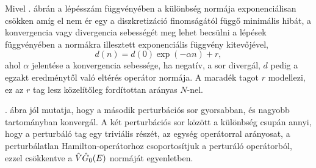 Mivel . ábrán a lépésszám függvényében a különbség normája exponenciálisan csökken amíg el nem ér egy a diszkretizáció finomságától függő minimális hibát, a konvergencia vagy divergencia sebességét meg lehet becsülni a lépések függvényében a normákra illesztett exponenciális függvény kitevőjével,
\begin{equation}
	d(n) = d(0)\exp(-\alpha n)+r,
	\label{perturbation:fit}
\end{equation}
ahol $\alpha$ jelentése a konvergencia sebessége, ha negatív, a sor divergál, $d$ pedig a egzakt eredménytől való eltérés operátor normája. A maradék tagot $r$ modellezi, ez az $r$ tag lesz közelítőleg fordítottan arányas $N$-nel.

. ábra jól mutatja, hogy a második perturbációs sor gyorsabban, és nagyobb tartományban konvergál. A két perturbációs sor között a különbség csupán annyi, hogy a perturbáló tag egy triviális részét, az egység operátorral arányosat, a perturbálatlan Hamilton-operátorhoz csoportosítjuk a perturáló operátorból, ezzel csökkentve a $\hat{V}\hat{G}_0(E)$ normáját  egyenletben.






